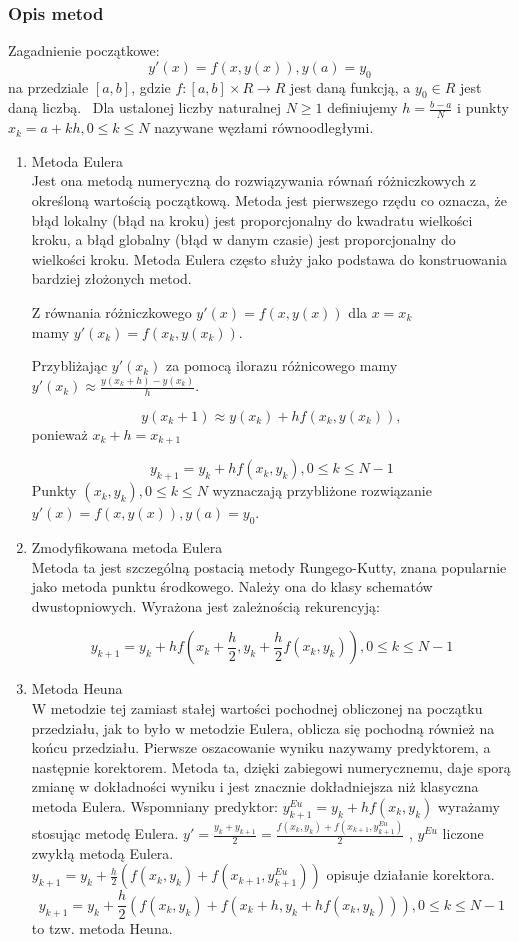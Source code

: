 \documentclass[12pt]{article}
\begin{document}
\subsubsection{Opis metod}
Zagadnienie początkowe:
$$y'(x)=f(x,y(x)),y(a)=y_0$$
na przedziale $[a,b]$, gdzie $f: [a,b] \times R \rightarrow R$ jest daną funkcją, a $y_0 \in R$ jest daną liczbą.
\ Dla ustalonej liczby naturalnej $N \geq 1$ definiujemy $h= \frac{b-a}{N}$ i punkty $x_k=a+kh, 0 \leq k \leq N$ nazywane węzłami równoodległymi.
\begin{enumerate}
\item 
Metoda Eulera 
\\Jest ona metodą numeryczną do rozwiązywania równań różniczkowych z określoną wartością początkową. Metoda jest pierwszego rzędu co oznacza, że błąd lokalny (błąd na kroku) jest proporcjonalny do kwadratu wielkości kroku, a błąd globalny (błąd w danym czasie) jest proporcjonalny do wielkości kroku.
 Metoda Eulera często służy jako podstawa do konstruowania bardziej złożonych metod.

Z równania różniczkowego $y'(x)=f(x,y(x))$ dla $x=x_k$ 
\\mamy
$y'(x_k)=f(x_k,y(x_k)).$

Przybliżając $y'(x_k)$ za pomocą ilorazu różnicowego mamy
\\ $y'(x_k)\approx\frac{y(x_k+h)-y(x_k)}{h}.$

$$y(x_k+1) \approx y(x_k) +hf(x_k,y(x_k)),$$  ponieważ $x_k+h=x_{k+1}$

$$y_{k+1}=y_k +hf(x_k,y_k), 0 \leq k \leq N-1$$ 
Punkty $(x_k,y_k), 0 \leq k \leq N$ wyznaczają przybliżone rozwiązanie 
\\ $y'(x)=f(x,y(x)),y(a)=y_0$.
\item 

Zmodyfikowana metoda Eulera
\\
Metoda ta jest szczególną postacią metody Rungego-Kutty, znana popularnie jako metoda punktu środkowego.
Należy ona do klasy schematów dwustopniowych.
Wyrażona jest zależnością rekurencyją:

$$y_{k+1}=y_k +hf(x_k + \frac{h}{2},y_k + \frac{h}{2}f(x_k,y_k)), 0 \leq k \leq N-1$$ 
\item Metoda Heuna
\\W metodzie tej zamiast stałej wartości pochodnej obliczonej na początku przedziału, jak to było w metodzie   Eulera,   oblicza   się   pochodną   również   na   końcu   przedziału.   Pierwsze   oszacowanie   wyniku nazywamy predyktorem, a następnie korektorem. Metoda ta, dzięki zabiegowi numerycznemu, daje sporą zmianę w dokładności wyniku i jest znacznie dokładniejsza niż klasyczna metoda Eulera.
Wspomniany predyktor: 
$y^{Eu}_{k+1}=y_k +hf(x_k,y_k)$ wyrażamy stosując metodę Eulera.
$y'=\frac{y_k+y_{k+1}}{2}=\frac{f(x_k,y_k)+f(x_{k+1},y^{Eu}_{k+1})}{2}$ , $y^{Eu}$ liczone zwykłą metodą Eulera.\\
$y_{k+1}=y_k +\frac{h}{2}(f(x_k,y_k )+f(x_{k+1},y^{Eu}_{k+1}))$ opisuje działanie korektora.
$$y_{k+1}=y_k +\frac{h}{2}(f(x_k,y_k )+f(x_k+h,y_k+hf(x_k,y_k))), 0 \leq k \leq N-1$$  to tzw. metoda Heuna.


\end{enumerate}
\end{document}
